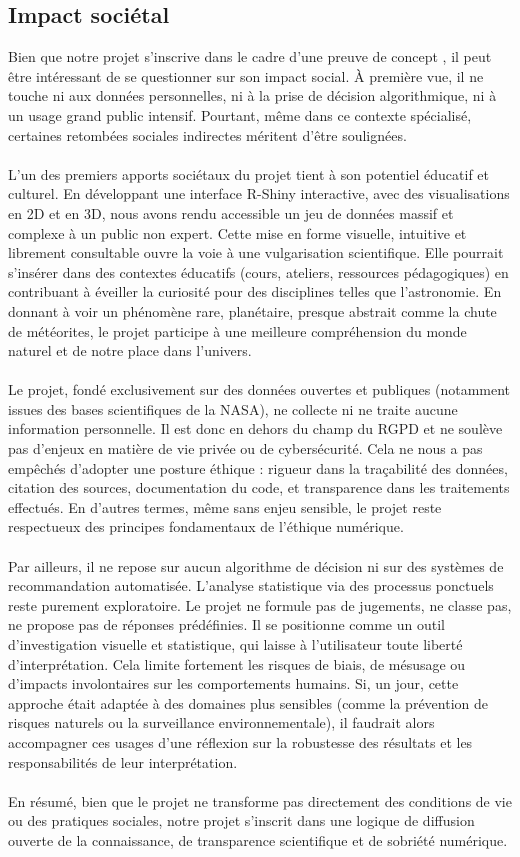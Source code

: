 \documentclass[12pt]{article}
\begin{document}
\subsection{Impact sociétal}
Bien que notre projet s’inscrive dans le cadre d’une preuve de concept , il peut être intéressant de se questionner sur son impact social. À première vue, il ne touche ni aux données personnelles, ni à la prise de décision algorithmique, ni à un usage grand public intensif. Pourtant, même dans ce contexte spécialisé, certaines retombées sociales indirectes méritent d’être soulignées.\\
\\
L’un des premiers apports sociétaux du projet tient à son potentiel éducatif et culturel. En développant une interface R-Shiny interactive, avec des visualisations en 2D et en 3D, nous avons rendu accessible un jeu de données massif et complexe à un public non expert. Cette mise en forme visuelle, intuitive et librement consultable ouvre la voie à une vulgarisation scientifique. Elle pourrait s’insérer dans des contextes éducatifs (cours, ateliers, ressources pédagogiques) en contribuant à éveiller la curiosité pour des disciplines telles que l’astronomie. En donnant à voir un phénomène rare, planétaire, presque abstrait comme la chute de météorites, le projet participe à une meilleure compréhension du monde naturel et de notre place dans l’univers.\\
\\
Le projet, fondé exclusivement sur des données ouvertes et publiques (notamment issues des bases scientifiques de la NASA), ne collecte ni ne traite aucune information personnelle. Il est donc en dehors du champ du RGPD et ne soulève pas d’enjeux en matière de vie privée ou de cybersécurité. Cela ne nous a pas empêchés d’adopter une posture éthique : rigueur dans la traçabilité des données, citation des sources, documentation du code, et transparence dans les traitements effectués. En d’autres termes, même sans enjeu sensible, le projet reste respectueux des principes fondamentaux de l’éthique numérique.\\
\\
Par ailleurs, il ne repose sur aucun algorithme de décision ni sur des systèmes de recommandation automatisée. L’analyse statistique via des processus ponctuels reste purement exploratoire. Le projet ne formule pas de jugements, ne classe pas, ne propose pas de réponses prédéfinies. Il se positionne comme un outil d’investigation visuelle et statistique, qui laisse à l’utilisateur toute liberté d’interprétation. Cela limite fortement les risques de biais, de mésusage ou d’impacts involontaires sur les comportements humains. Si, un jour, cette approche était adaptée à des domaines plus sensibles (comme la prévention de risques naturels ou la surveillance environnementale), il faudrait alors accompagner ces usages d’une réflexion sur la robustesse des résultats et les responsabilités de leur interprétation.\\
\\
En résumé, bien que le projet ne transforme pas directement des conditions de vie ou des pratiques sociales, notre projet s’inscrit dans une logique de diffusion ouverte de la connaissance, de transparence scientifique et de sobriété numérique. 
\end{document}
